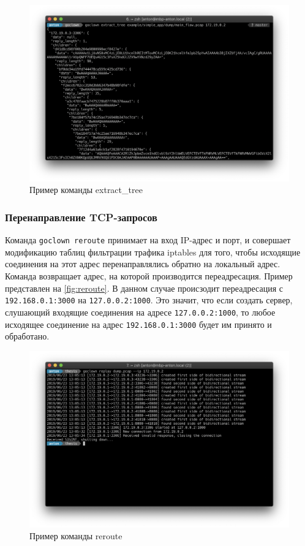 \begin{figure}[H]
\includegraphics[width=\textwidth,height=\textheight,keepaspectratio]
    {img/extract_tree.png}
\caption{Пример команды extract\_tree}
\label{fig:extracttree}
\end{figure}

\subsubsection{Перенаправление TCP-запросов}
Команда \lstinline{goclown reroute} принимает на вход IP-адрес и порт, и
совершает модификацию таблиц фильтрации трафика iptables для того, чтобы
исходящие соединения на этот адрес перенаправлялись обратно на локальный адрес.
Команда возвращает адрес, на которой производится переадресация. Пример
представлен на \autoref{fig:reroute}. В данном случае происзодит переадресация
с \lstinline{192.168.0.1:3000} на \lstinline{127.0.0.2:1000}. Это значит, что
если создать сервер, слушающий входящие соединения на адресе
\lstinline{127.0.0.2:1000}, то любое исходящее соединение на адрес
\lstinline{192.168.0.1:3000} будет им принято и обработано.

\begin{figure}[H]
\includegraphics[width=\textwidth,height=\textheight,keepaspectratio]
    {img/reroute.png}
\caption{Пример команды reroute}
\label{fig:reroute}
\end{figure}

